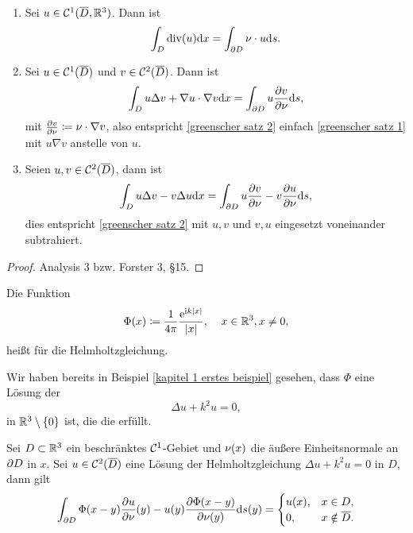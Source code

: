 \begin{satz}\
	\begin{enumerate}[label=(\roman*)]
		\item Sei \(u\in\mathcal{C}^1(\overline{D},\mathbb{R}^3)\). Dann ist
		\begin{equation}
			\label{greenscher satz 1}
			\int_D\operatorname{div}( u) \mathrm{d}x=\int_{\partial D}\nu\cdot u\mathrm{d}s.
		\end{equation}
		\item Sei \(u\in\mathcal{C}^1(\overline{D})\) und \(v\in\mathcal{C}^2(\overline{D})\). Dann ist
		\begin{equation}
			\label{greenscher satz 2}
			\int_D u\Delta v+\nabla u\cdot\nabla v\mathrm{d}x=\int_{\partial D}u\frac{\partial v}{\partial\nu}\mathrm{d}s,
		\end{equation}
		mit \(\frac{\partial v}{\partial\nu}\coloneqq\nu\cdot\nabla v\), also entspricht \eqref{greenscher satz 2} einfach \eqref{greenscher satz 1} mit \(u\nabla v\) anstelle von \(u\).
		\item Seien \(u,v\in\mathcal{C}^2(\overline{D})\), dann ist
		\begin{equation}
			\label{greenscher satz 3}
			\int_Du\Delta v-v\Delta u\mathrm{d}x=\int_{\partial D}u\frac{\partial v}{\partial\nu}-v\frac{\partial u}{\partial\nu}\mathrm{d}s,
		\end{equation}
		dies entspricht \eqref{greenscher satz 2} mit \(u,v\) und \(v,u\) eingesetzt voneinander subtrahiert.
	\end{enumerate}
\end{satz}
\begin{proof}
	Analysis 3 bzw. Forster 3, §15.
\end{proof}
\begin{definition}[Fundamentallösung]
	Die Funktion
	\begin{equation*}
		\Phi(x)\coloneqq\frac{1}{4\pi}\frac{\mathrm{e}^{\mathrm{i} k|x|}}{|x|},\;\;\;\;x\in\mathbb{R}^3,x\neq0,
	\end{equation*}
	heißt  für die Helmholtzgleichung.
\end{definition}
Wir haben bereits in Beispiel \ref{kapitel 1 erstes beispiel} gesehen, dass \(\Phi\) eine Lösung der 
\begin{equation*}
	\Delta u+k^2u=0,
\end{equation*}
in \(\mathbb{R}^3\setminus\{0\}\) ist, die die \SAB erfüllt.
\begin{satz}\label{satz: darstellungssatz im inneren}
	Sei \(D\subset\mathbb{R}^3\) ein beschränktes \(\mathcal{C}^1\)-Gebiet und \(\nu(x)\) die äußere Einheitsnormale an \(\partial D\) in \(x\). Sei \(u\in\mathcal{C}^2(\overline{D})\) eine Lösung der Helmholtzgleichung \(\Delta u+k^2u=0\) in \(D\), dann gilt
	\begin{equation}
		\label{darstellungssatz im inneren}
		\int_{\partial D}\Phi(x-y)\frac{\partial u}{\partial\nu}(y)-u(y)\frac{\partial\Phi(x-y)}{\partial\nu(y)}\mathrm{d}s(y)=
		\begin{cases}
			u(x),&x\in D,\\
			0,&x\notin\overline{D}.
		\end{cases}
	\end{equation}
\end{satz}
